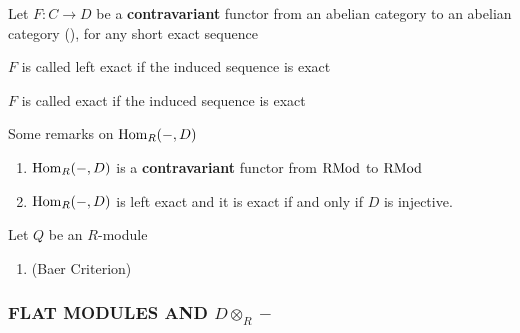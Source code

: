 \begin{remark}
	Let $F: C \to D$ be a \textbf{contravariant} functor from an abelian category to an abelian category (), for any short exact sequence
	\begin{center}
	\end{center}
	
	$F$ is called left exact if the induced sequence is exact
	\begin{center}
	\end{center}
	
	$F$ is called exact if the induced sequence is exact
	\begin{center}
	\end{center}
\end{remark}

\begin{remark}
	Some remarks on $\operatorname{Hom}_R(-, D)$
	\begin{enumerate}
		\item $\operatorname{Hom}_R(-, D)$ is a \textbf{contravariant} functor from $\operatorname{RMod}$ to $\operatorname{RMod}$
		\item $\operatorname{Hom}_R(-, D)$ is left exact and it is exact if and only if $D$ is injective.
	\end{enumerate}
\end{remark}

\begin{proposition}
	Let $Q$ be an $R$-module
	\begin{enumerate}
		\item (Baer Criterion)
	\end{enumerate}
\end{proposition}


\subsubsection{FLAT MODULES AND $D \otimes_R -$}


